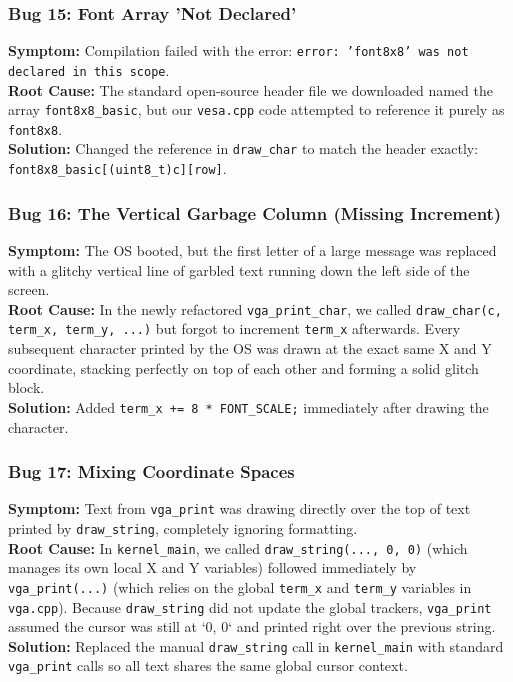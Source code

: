 \documentclass[12pt,a4paper]{report}
\begin{document}
\subsubsection*{Bug 15: Font Array 'Not Declared'}
\textbf{Symptom:} Compilation failed with the error: \texttt{error: 'font8x8' was not declared in this scope}.\\
\textbf{Root Cause:} The standard open-source header file we downloaded named the array \texttt{font8x8\_basic}, but our \texttt{vesa.cpp} code attempted to reference it purely as \texttt{font8x8}.\\
\textbf{Solution:} Changed the reference in \texttt{draw\_char} to match the header exactly: \texttt{font8x8\_basic[(uint8\_t)c][row]}.

\subsubsection*{Bug 16: The Vertical Garbage Column (Missing Increment)}
\textbf{Symptom:} The OS booted, but the first letter of a large message was replaced with a glitchy vertical line of garbled text running down the left side of the screen.\\
\textbf{Root Cause:} In the newly refactored \texttt{vga\_print\_char}, we called \texttt{draw\_char(c, term\_x, term\_y, ...)} but forgot to increment \texttt{term\_x} afterwards. Every subsequent character printed by the OS was drawn at the exact same X and Y coordinate, stacking perfectly on top of each other and forming a solid glitch block.\\
\textbf{Solution:} Added \texttt{term\_x += 8 * FONT\_SCALE;} immediately after drawing the character.

\subsubsection*{Bug 17: Mixing Coordinate Spaces}
\textbf{Symptom:} Text from \texttt{vga\_print} was drawing directly over the top of text printed by \texttt{draw\_string}, completely ignoring formatting.\\
\textbf{Root Cause:} In \texttt{kernel\_main}, we called \texttt{draw\_string(..., 0, 0)} (which manages its own local X and Y variables) followed immediately by \texttt{vga\_print(...)} (which relies on the global \texttt{term\_x} and \texttt{term\_y} variables in \texttt{vga.cpp}). Because \texttt{draw\_string} did not update the global trackers, \texttt{vga\_print} assumed the cursor was still at `0, 0` and printed right over the previous string.\\
\textbf{Solution:} Replaced the manual \texttt{draw\_string} call in \texttt{kernel\_main} with standard \texttt{vga\_print} calls so all text shares the same global cursor context.
\end{document}
